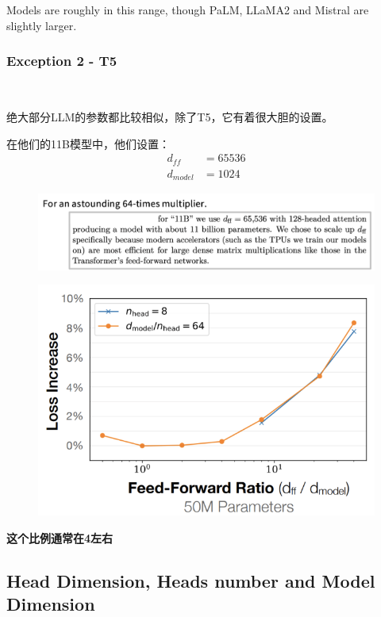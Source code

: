 Models are roughly in this range, though PaLM, LLaMA2 and Mistral are slightly larger.

\subsubsection{Exception 2 - T5}~{}

绝大部分LLM的参数都比较相似，除了T5，它有着很大胆的设置。

在他们的11B模型中，他们设置：
\begin{align*}
  d_{ff} &= 65536\\
  d_{model} &= 1024
\end{align*}

\begin{figure}[htbp]
  \centering
  \includegraphics[width=0.8\linewidth]{figs/lec3/lec3.21.png}
\end{figure}

\begin{figure}[htbp]
  \centering
  \includegraphics[width=0.8\linewidth]{figs/lec3/lec3.22.png}
\end{figure}

\textbf{这个比例通常在4左右}


\clearpage
\subsection{Head Dimension, Heads number and Model Dimension}

